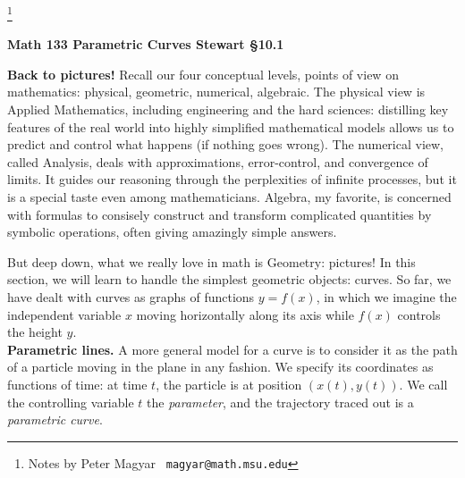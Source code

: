 \documentclass[11pt]{article}
\begin{document}
\footnote[0]{Notes by Peter Magyar \ {\tt magyar@math.msu.edu}}
\vspace{-1em}

\centerline{\bf Math 133\hspace{1.5em} \hfill{\Large\bf
Parametric Curves}\hfill 
Stewart \S10.1}
\vspace{1em}

\noindent 
{\bf Back to pictures!} Recall our four conceptual levels, 
points of view on mathematics: physical, geometric, numerical, algebraic.
The physical view is Applied Mathematics, including
engineering and the hard sciences: distilling key features of the real world
into highly simplified mathematical models allows us
to predict and control what happens (if nothing goes wrong).
The numerical view, called Analysis,
deals with approximations, error-control, and convergence of limits.
It guides our reasoning through the perplexities of 
infinite processes, but it is a special taste even among mathematicians.  
Algebra, my favorite, is concerned with formulas
to consisely construct and transform complicated quantities by 
symbolic operations, often giving amazingly simple answers.

But deep down, what we really love in math is Geometry: pictures! 
In this section, we will learn to handle the simplest geometric objects: curves.
So far, we have dealt with curves as graphs of functions $y=f(x)$,
in which we imagine the independent variable $x$ moving horizontally along its axis while $f(x)$ controls the height $y$.
\\[1em]
{\bf Parametric lines.}
A more general model for a curve is to consider it as the path of a particle moving in the plane in any fashion. We specify its coordinates as functions of time:
at time $t$, the particle is at position $(x(t),y(t))$. 
We call the controlling variable $t$ the {\it parameter}, 
and the trajectory traced out is a {\it parametric curve}.  
\end{document}
